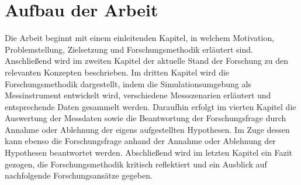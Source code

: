 \section{Aufbau der Arbeit}

Die Arbeit beginnt mit einem einleitenden Kapitel, in welchem Motivation, Problemstellung, Zielsetzung und Forschungsmethodik erläutert sind.
Anschließend wird im zweiten Kapitel der aktuelle Stand der Forschung zu den relevanten Konzepten beschrieben.
Im dritten Kapitel wird die Forschungsmethodik dargestellt, indem die Simulationsumgebung als Messinstrument entwickelt wird, verschiedene Messszenarien erläutert und entsprechende Daten gesammelt werden. 
Daraufhin erfolgt im vierten Kapitel die Auswertung der Messdaten sowie die Beantwortung der Forschungsfrage durch Annahme oder Ablehnung der eigens aufgestellten Hypothesen.
Im Zuge dessen kann ebenso die Forschungsfrage anhand der Annahme oder Ablehnung der Hypothesen beantwortet werden.
Abschließend wird im letzten Kapitel ein Fazit gezogen, die Forschungsmethodik kritisch reflektiert und ein Ausblick auf nachfolgende Forschungsansätze gegeben.